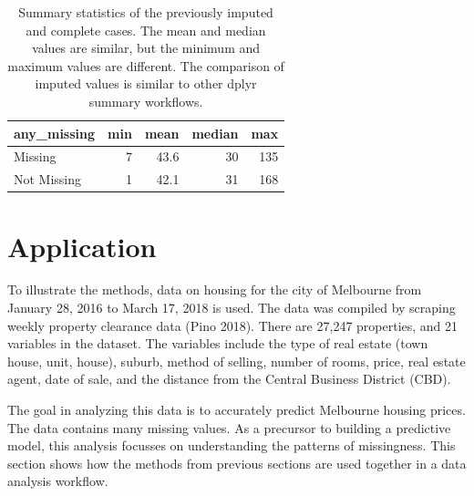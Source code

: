\documentclass[]{article}
\newenvironment{Shaded}{\begin{snugshade}}{\end{snugshade}}
\newcommand{\DataTypeTok}[1]{\textcolor[rgb]{0.13,0.29,0.53}{#1}}
\newcommand{\KeywordTok}[1]{\textcolor[rgb]{0.13,0.29,0.53}{\textbf{#1}}}
\newcommand{\NormalTok}[1]{#1}
\newcommand{\OperatorTok}[1]{\textcolor[rgb]{0.81,0.36,0.00}{\textbf{#1}}}
\newcommand{\StringTok}[1]{\textcolor[rgb]{0.31,0.60,0.02}{#1}}
\theoremstyle{definition}
\theoremstyle{definition}
\theoremstyle{definition}
\theoremstyle{remark}
\begin{document}
\begin{Shaded}
\end{Shaded}

\begin{table}[!h]

\caption{\label{tab:impute-summary}Summary statistics of the previously imputed and complete cases. The mean and median values are similar, but the minimum and maximum values are different. The comparison of imputed values is similar to other dplyr summary workflows.}
\centering
\begin{tabular}[t]{lrrrr}
\toprule
any\_missing & min & mean & median & max\\
\midrule
Missing & 7 & 43.6 & 30 & 135\\
Not Missing & 1 & 42.1 & 31 & 168\\
\bottomrule
\end{tabular}
\end{table}

\hypertarget{case-study}{%
\section{Application}\label{case-study}}

To illustrate the methods, data on housing for the city of Melbourne
from January 28, 2016 to March 17, 2018 is used. The data was compiled
by scraping weekly property clearance data (Pino 2018). There are 27,247
properties, and 21 variables in the dataset. The variables include the
type of real estate (town house, unit, house), suburb, method of
selling, number of rooms, price, real estate agent, date of sale, and
the distance from the Central Business District (CBD).

The goal in analyzing this data is to accurately predict Melbourne
housing prices. The data contains many missing values. As a precursor to
building a predictive model, this analysis focusses on understanding the
patterns of missingness. This section shows how the methods from
previous sections are used together in a data analysis workflow.
\end{document}
